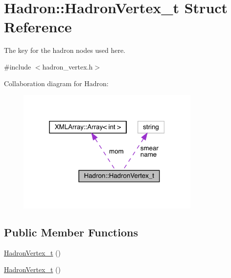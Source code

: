 \hypertarget{structHadron_1_1HadronVertex__t}{}\section{Hadron\+:\+:Hadron\+Vertex\+\_\+t Struct Reference}
\label{structHadron_1_1HadronVertex__t}


The key for the hadron nodes used here.  




{\ttfamily \#include $<$hadron\+\_\+vertex.\+h$>$}



Collaboration diagram for Hadron\+:\nopagebreak
\begin{figure}[H]
\begin{center}
\leavevmode
\includegraphics[width=256pt]{dd/d46/structHadron_1_1HadronVertex__t__coll__graph}
\end{center}
\end{figure}
\subsection*{Public Member Functions}
\begin{DoxyCompactItemize}
\item 
\mbox{\hyperlink{structHadron_1_1HadronVertex__t_ab203b17e0f020c77fc233e70c0466691}{Hadron\+Vertex\+\_\+t}} ()
\item 
\mbox{\hyperlink{structHadron_1_1HadronVertex__t_ab203b17e0f020c77fc233e70c0466691}{Hadron\+Vertex\+\_\+t}} ()
\end{DoxyCompactItemize}
